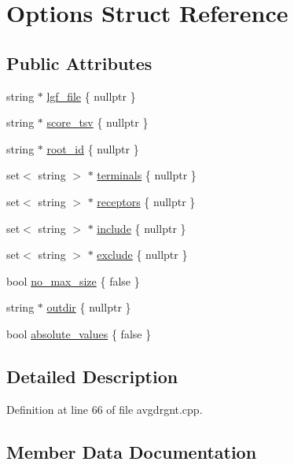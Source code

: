 \hypertarget{structOptions}{}\section{Options Struct Reference}
\label{structOptions}
\subsection*{Public Attributes}
\begin{DoxyCompactItemize}
\item 
string $\ast$ \hyperlink{structOptions_ab1d4dd586f45745c976ef7fcd2536221}{lgf\+\_\+file} \{ nullptr \}
\item 
string $\ast$ \hyperlink{structOptions_a1f2fa7263f58ae203aa79f71b4a26540}{score\+\_\+tsv} \{ nullptr \}
\item 
string $\ast$ \hyperlink{structOptions_a7df263753dc02f88a187ed119f3f8c37}{root\+\_\+id} \{ nullptr \}
\item 
set$<$ string $>$ $\ast$ \hyperlink{structOptions_a50e99d4f8be4e78eea581ea9378d3b4a}{terminals} \{ nullptr \}
\item 
set$<$ string $>$ $\ast$ \hyperlink{structOptions_a4192410864fec99db1eea65c8d8dfb52}{receptors} \{ nullptr \}
\item 
set$<$ string $>$ $\ast$ \hyperlink{structOptions_a90ea5ea52a8010baead4fa1c9b587b6f}{include} \{ nullptr \}
\item 
set$<$ string $>$ $\ast$ \hyperlink{structOptions_a0b4e7353a06f655fb83a2402ed52ecd0}{exclude} \{ nullptr \}
\item 
bool \hyperlink{structOptions_a8ad3707dd08d31b9084188a549126644}{no\+\_\+max\+\_\+size} \{ false \}
\item 
string $\ast$ \hyperlink{structOptions_a80746ce696086f5fb130d798849d0277}{outdir} \{ nullptr \}
\item 
bool \hyperlink{structOptions_a86e7be53c40b22db67261e2c34282736}{absolute\+\_\+values} \{ false \}
\end{DoxyCompactItemize}


\subsection{Detailed Description}


Definition at line 66 of file avgdrgnt.\+cpp.



\subsection{Member Data Documentation}
\mbox{\label{structOptions_a86e7be53c40b22db67261e2c34282736}} 
